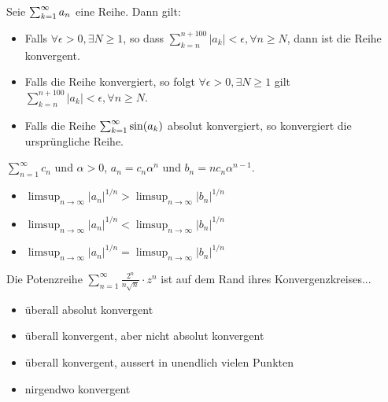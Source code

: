 Seie $\sum_{k = 1}^{\infty} a_n$ eine Reihe. Dann gilt:
\begin{itemize}
    \item[$\square$]
    Falls $\forall \epsilon > 0, \exists N \geq 1$, so dass $\sum_{k = n}^{n+100} |a_k| < \epsilon, \forall n \geq N$,
    dann ist die Reihe konvergent.
    \item[\rlap{\raisebox{0.3ex}{\hspace{0.4ex}\tiny \ding{52}}}$\square$]
    Falls die Reihe konvergiert, so folgt $\forall \epsilon > 0, \exists N \geq 1$ gilt 
    $\sum_{k = n}^{n+100} |a_k| < \epsilon, \forall n \geq N$.
    \item[$\square$]
    Falls die Reihe $\sum_{k = 1}^{\infty} \sin(a_k)$ absolut konvergiert, so konvergiert die ursprüngliche Reihe.
\end{itemize}

$\sum_{n = 1}^{\infty} c_n$ und $\alpha > 0$, $a_n = c_n\alpha^n$
und $b_n = nc_n\alpha^{n-1}$.
\begin{itemize}
    \item[$\square$]
    $\limsup_{n \to \infty} |a_n|^{1/n} > \limsup_{n \to \infty} |b_n|^{1/n}$
    \item[$\square$]
    $\limsup_{n \to \infty} |a_n|^{1/n} < \limsup_{n \to \infty} |b_n|^{1/n}$
    \item[\rlap{\raisebox{0.3ex}{\hspace{0.4ex}\tiny \ding{52}}}$\square$]
    $\limsup_{n \to \infty} |a_n|^{1/n} = \limsup_{n \to \infty} |b_n|^{1/n}$
\end{itemize}

Die Potenzreihe $\sum_{n = 1}^\infty \frac{2^n}{n\sqrt{n}} \cdot z^n$ ist auf dem Rand ihres 
Konvergenzkreises...
\begin{itemize}
    \item[\rlap{\raisebox{0.3ex}{\hspace{0.4ex}\tiny \ding{52}}}$\square$]
    überall absolut konvergent
    \item[$\square$]
    überall konvergent, aber nicht absolut konvergent
    \item[$\square$]
    überall konvergent, aussert in unendlich vielen Punkten
    \item[$\square$]
    nirgendwo konvergent
\end{itemize}

